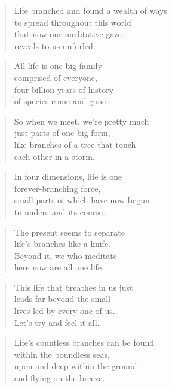 \documentclass[14pt,a4paper]{article}
\begin{document}
\begin{verse}
Life branched and found a wealth of ways\\
to spread throughout this world\\
that now our meditative gaze\\
reveals to us unfurled.
\end{verse}

\begin{verse}
All life is one big family\\
comprised of everyone,\\
four billion years of history\\
of species come and gone.
\end{verse}

\begin{verse}
So when we meet, we’re pretty much\\
just parts of one big form,\\
like branches of a tree that touch\\
each other in a storm.
\end{verse}

\begin{verse}
In four dimensions, life is one\\
forever-branching force,\\
small parts of which have now begun\\
to understand its course.
\end{verse}

\begin{verse}
The present seems to separate\\
life’s branches like a knife.\\
Beyond it, we who meditate\\
here now are all one life.
\end{verse}

\begin{verse}
This life that breathes in us just\\
leads far beyond the small\\
lives led by every one of us.\\
Let’s try and feel it all.
\end{verse}

\begin{verse}
Life’s countless branches can be found\\
within the boundless seas,\\
upon and deep within the ground\\
and flying on the breeze.
\end{verse}
\end{document}
